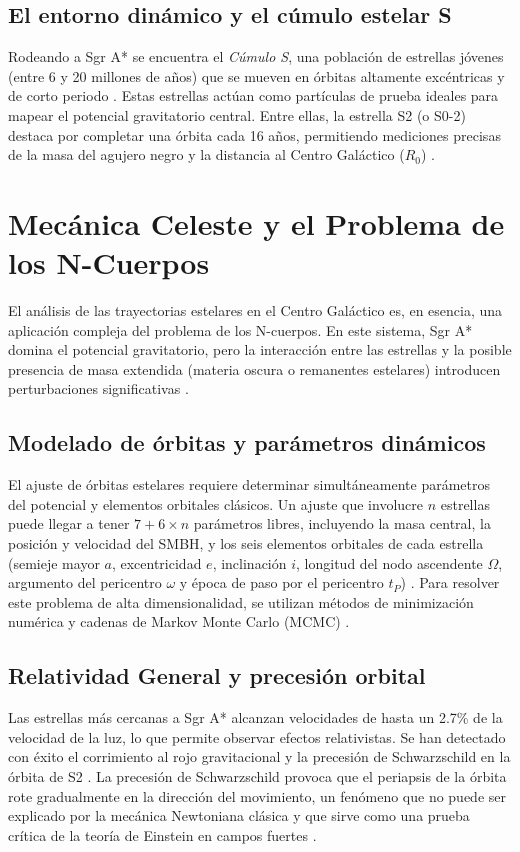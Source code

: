 \documentclass[a4paper]{article}
\begin{document}
\subsection{El entorno dinámico y el cúmulo estelar S}
Rodeando a Sgr A* se encuentra el \textit{Cúmulo S}, una población de estrellas jóvenes (entre 6 y 20 millones de años) que se mueven en órbitas altamente excéntricas y de corto periodo \cite{ciurlo2025sagittarius}. Estas estrellas actúan como partículas de prueba ideales para mapear el potencial gravitatorio central. Entre ellas, la estrella S2 (o S0-2) destaca por completar una órbita cada 16 años, permitiendo mediciones precisas de la masa del agujero negro y la distancia al Centro Galáctico ($R_0$) \cite{gillessen2017update}.

\section{Mecánica Celeste y el Problema de los N-Cuerpos}

El análisis de las trayectorias estelares en el Centro Galáctico es, en esencia, una aplicación compleja del problema de los N-cuerpos. En este sistema, Sgr A* domina el potencial gravitatorio, pero la interacción entre las estrellas y la posible presencia de masa extendida (materia oscura o remanentes estelares) introducen perturbaciones significativas \cite{gillessen2017update, ali2020kinematic}.

\subsection{Modelado de órbitas y parámetros dinámicos}
El ajuste de órbitas estelares requiere determinar simultáneamente parámetros del potencial y elementos orbitales clásicos. Un ajuste que involucre $n$ estrellas puede llegar a tener $7 + 6 \times n$ parámetros libres, incluyendo la masa central, la posición y velocidad del SMBH, y los seis elementos orbitales de cada estrella (semieje mayor $a$, excentricidad $e$, inclinación $i$, longitud del nodo ascendente $\Omega$, argumento del pericentro $\omega$ y época de paso por el pericentro $t_P$) \cite{gillessen2017update}. Para resolver este problema de alta dimensionalidad, se utilizan métodos de minimización numérica y cadenas de Markov Monte Carlo (MCMC) \cite{gillessen2017update}.

\subsection{Relatividad General y precesión orbital}
Las estrellas más cercanas a Sgr A* alcanzan velocidades de hasta un 2.7\% de la velocidad de la luz, lo que permite observar efectos relativistas. Se han detectado con éxito el corrimiento al rojo gravitacional y la precesión de Schwarzschild en la órbita de S2 \cite{ciurlo2025sagittarius}. La precesión de Schwarzschild provoca que el periapsis de la órbita rote gradualmente en la dirección del movimiento, un fenómeno que no puede ser explicado por la mecánica Newtoniana clásica y que sirve como una prueba crítica de la teoría de Einstein en campos fuertes \cite{ciurlo2025sagittarius}.
\end{document}
